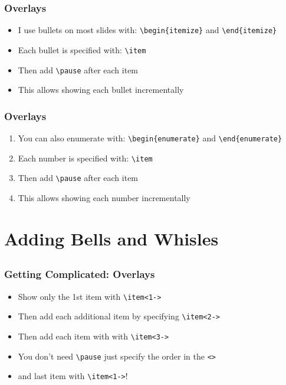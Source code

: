 \documentclass{beamer}
\begin{document}
\begin{frame}[fragile]
  \frametitle{Overlays}
  \begin{itemize}
  \item I use bullets on most slides with: \verb|\begin{itemize}| and \verb|\end{itemize}|
  \pause
  \item Each bullet is specified with: \verb|\item|
  \pause
  \item Then add \verb|\pause| after each item
  \pause
  \item This allows showing each bullet incrementally
  \end{itemize}
\end{frame}

\begin{frame}[fragile]
  \frametitle{Overlays}
  \begin{enumerate}
  \item You can also enumerate with: \verb|\begin{enumerate}| and \verb|\end{enumerate}|
  \pause
  \item Each number is specified with: \verb|\item|
  \pause
  \item Then add \verb|\pause| after each item
  \pause
  \item This allows showing each number incrementally
  \end{enumerate}
\end{frame}

\section{Adding Bells and Whisles}
\subsection{}
\begin{frame}[fragile]
  \frametitle{Getting Complicated: Overlays}
  \begin{itemize}
  \item<1-> Show only the 1st item with \verb|\item<1->|
  \item<2-> Then add each additional item by specifying \verb|\item<2->|
  \item<3-> Then add each item with with \verb|\item<3->|
  \item<4-> You don't need \verb|\pause| just specify the order in the \verb|<>|
  \item<1-> and last item with \verb|\item<1->|!
  \end{itemize}
\end{frame}
\end{document}
